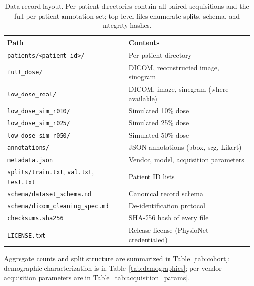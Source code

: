 \documentclass[twoside,11pt]{article}
\begin{document}
\begin{table}[h]
    \centering
    \begin{tabular}{lp{8.5cm}}
        \toprule
        \textbf{Path} & \textbf{Contents} \\
        \midrule
        \texttt{patients/<patient\_id>/} & Per-patient directory \\
        \quad \texttt{full\_dose/} & DICOM, reconstructed image, sinogram \\
        \quad \texttt{low\_dose\_real/} & DICOM, image, sinogram (where available) \\
        \quad \texttt{low\_dose\_sim\_r010/} & Simulated 10\% dose \\
        \quad \texttt{low\_dose\_sim\_r025/} & Simulated 25\% dose \\
        \quad \texttt{low\_dose\_sim\_r050/} & Simulated 50\% dose \\
        \quad \texttt{annotations/} & JSON annotations (bbox, seg, Likert) \\
        \quad \texttt{metadata.json} & Vendor, model, acquisition parameters \\
        \texttt{splits/train.txt}, \texttt{val.txt}, \texttt{test.txt} & Patient ID lists \\
        \texttt{schema/dataset\_schema.md} & Canonical record schema \\
        \texttt{schema/dicom\_cleaning\_spec.md} & De-identification protocol \\
        \texttt{checksums.sha256} & SHA-256 hash of every file \\
        \texttt{LICENSE.txt} & Release license (PhysioNet credentialed) \\
        \bottomrule
    \end{tabular}
    \caption{Data record layout. Per-patient directories contain all paired acquisitions and the full per-patient annotation set; top-level files enumerate splits, schema, and integrity hashes.}
    \label{tab:data_records}
\end{table}

Aggregate counts and split structure are summarized in Table~\ref{tab:cohort}; demographic characterization is in Table~\ref{tab:demographics}; per-vendor acquisition parameters are in Table~\ref{tab:acquisition_params}.
\end{document}
